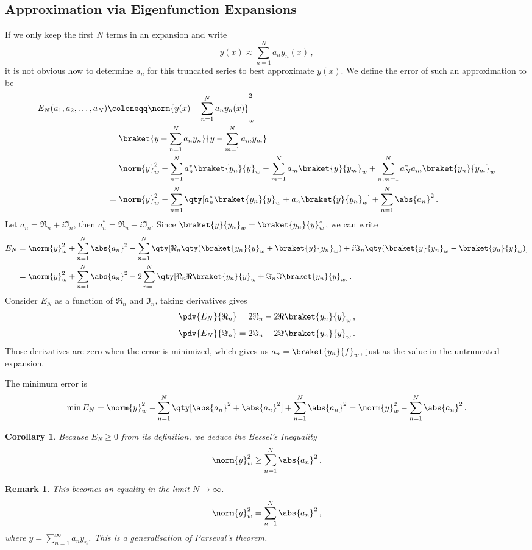 \documentclass{article}
\theoremstyle{plain}\theoremheaderfont{\normalfont\itshape}\theorembodyfont{\rmfamily}\theoremseparator{.}\newtheorem*{rem}{Remark}\newtheorem*{ex}{Example}\newtheorem*{proof}{Proof}\newtheorem*{altp}{Alternative proof}
\theoremstyle{plain}\theoremheaderfont{\normalfont\bfseries}\theorembodyfont{\rmfamily}\theoremseparator{.}\newtheorem{thm}{Theorem}[section]\newtheorem{lem}[thm]{Lemma}\newtheorem{prop}[thm]{Proposition}\newtheorem*{cor}{Corollary}\newtheorem{defn}[thm]{Definition}\newtheorem{clm}[thm]{Claim}\newtheorem{clminproof}{Claim}
\theoremstyle{break}\theoremheaderfont{\normalfont\itshape}\theorembodyfont{\rmfamily}\theoremseparator{.\medskip}\newtheorem*{proofskip}{Proof}\newtheorem*{exs}{Examples}\newtheorem*{rems}{Remarks}
\theoremstyle{break}\theoremheaderfont{\normalfont\bfseries}\theorembodyfont{\rmfamily}\theoremseparator{.\medskip}\newtheorem{lemskip}[thm]{Lemma}\newtheorem{defnskip}[thm]{Definition}\newtheorem{propskip}[thm]{Proposition}\newtheorem{thmskip}[thm]{Theorem}
\numberwithin{equation}{section}
\begin{document}
	\subsection{Approximation via Eigenfunction Expansions}
	If we only keep the first \(N\) terms in an expansion and write
	\[y(x)\approx \sum_{n=1}^{N}a_n y_n(x)\,,\]
	it is not obvious how to determine \(a_n\) for this truncated series to best approximate \(y(x)\). We define the error of such an approximation to be
	\begin{align*}
		E_N(a_1,a_2,\dots,a_N)&\coloneqq\norm{y(x)-\sum_{n=1}^{N}a_ny_n(x)}_w^2\\
		&=\braket{y-\sum_{n=1}^{N}a_ny_n}{y-\sum_{m=1}^{N}a_my_m}\\
		&=\norm{y}_w^2-\sum_{n=1}^{N}a_n^*\braket{y_n}{y}_w-\sum_{m=1}^{N}a_m\braket{y}{y_m}_w+\sum_{n,m=1}^{N}a_N^*a_m\braket{y_n}{y_m}_w\\
		&=\norm{y}_w^2-\sum_{n=1}^{N}\qty[a_n^*\braket{y_n}{y}_w+a_n\braket{y}{y_n}_w]+\sum_{n=1}^{N}\abs{a_n}^2\,.
	\end{align*} 
	Let \(a_n=\Re_n+i\Im_n\), then \(a_n^*=\Re_n-i\Im_n\). Since \(\braket{y}{y_n}_w=\braket{y_n}{y}_w^*\), we can write
	\begin{align*}
		E_N&=\norm{y}_w^2+\sum_{n=1}^{N}\abs{a_n}^2-\sum_{n=1}^{N}\qty[\Re_n\qty(\braket{y_n}{y}_w+\braket{y}{y_n}_w)+i\Im_n\qty(\braket{y}{y_n}_w-\braket{y_n}{y}_w)]\\
		&=\norm{y}_w^2+\sum_{n=1}^{N}\abs{a_n}^2-2\sum_{n=1}^{N}\qty[\Re_n\Re\braket{y_n}{y}_w+\Im_n\Im\braket{y_n}{y}_w]\,.
	\end{align*}
	Consider \(E_N\) as a function of \(\Re_n\) and \(\Im_n\), taking derivatives gives
	\[\pdv{E_N}{\Re_n}=2\Re_n-2\Re\braket{y_n}{y}_w\,,\]
	\[\pdv{E_N}{\Im_n}=2\Im_n-2\Im\braket{y_n}{y}_w\,.\]
	Those derivatives are zero when the error is minimized, which gives us \(a_n=\braket{y_n}{f}_w\), just as the value in the untruncated expansion.

	The minimum error is
	\[\min E_N=\norm{y}_w^2-\sum_{n=1}^{N}\qty[\abs{a_n}^2+\abs{a_n}^2]+\sum_{n=1}^{N}\abs{a_n}^2=\norm{y}_w^2-\sum_{n=1}^{N}\abs{a_n}^2\,.\]
	
	\begin{cor}
		Because \(E_N\ge 0\) from its definition, we deduce the \textit{Bessel's Inequality}
		\[\norm{y}_w^2\ge\sum_{n=1}^{N}\abs{a_n}^2\,.\]
	\end{cor}

	\begin{rem}
		This becomes an equality in the limit \(N\to\infty\).
		\[\norm{y}_w^2=\sum_{n=1}^{N}\abs{a_n}^2\,,\]
		where \(y=\sum_{n=1}^{\infty}a_ny_n\). This is a generalisation of Parseval's theorem.
	\end{rem}
	\newpage
\end{document}
